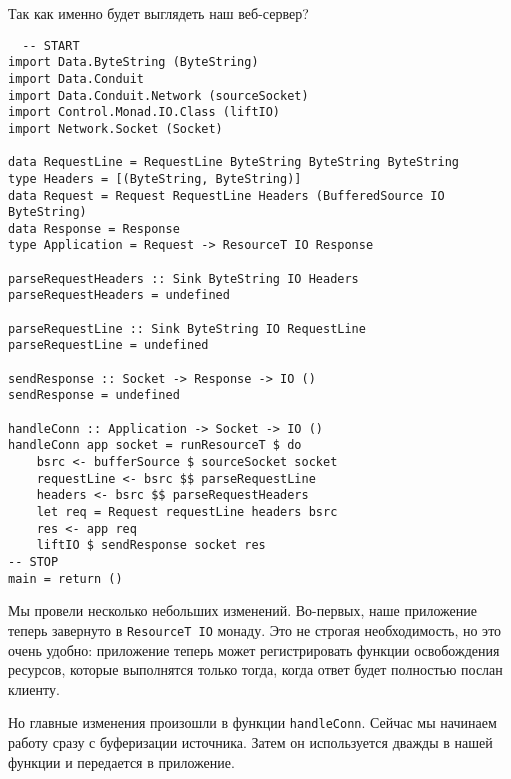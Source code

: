 Так как именно будет выглядеть наш веб-сервер?
\begin{lstlisting}
  -- START
import Data.ByteString (ByteString)
import Data.Conduit
import Data.Conduit.Network (sourceSocket)
import Control.Monad.IO.Class (liftIO)
import Network.Socket (Socket)

data RequestLine = RequestLine ByteString ByteString ByteString
type Headers = [(ByteString, ByteString)]
data Request = Request RequestLine Headers (BufferedSource IO ByteString)
data Response = Response
type Application = Request -> ResourceT IO Response

parseRequestHeaders :: Sink ByteString IO Headers
parseRequestHeaders = undefined

parseRequestLine :: Sink ByteString IO RequestLine
parseRequestLine = undefined

sendResponse :: Socket -> Response -> IO ()
sendResponse = undefined

handleConn :: Application -> Socket -> IO ()
handleConn app socket = runResourceT $ do
    bsrc <- bufferSource $ sourceSocket socket
    requestLine <- bsrc $$ parseRequestLine
    headers <- bsrc $$ parseRequestHeaders
    let req = Request requestLine headers bsrc
    res <- app req
    liftIO $ sendResponse socket res
-- STOP
main = return ()
\end{lstlisting}
Мы провели несколько небольших изменений. Во-первых, наше приложение теперь завернуто в 
\lstinline=ResourceT IO= монаду. Это не строгая необходимость, но это очень удобно:
приложение теперь может регистрировать функции освобождения ресурсов, которые выполнятся только тогда, когда ответ будет полностью послан клиенту.

Но главные изменения произошли в функции \lstinline=handleConn=. Сейчас мы начинаем работу
сразу с буферизации источника. Затем он используется дважды в нашей функции и передается в
приложение.

